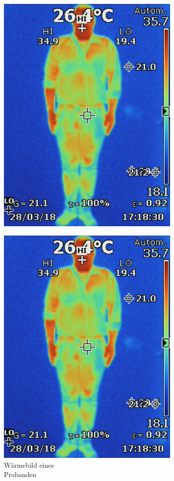 \begin{figure}[H]
		\centering
	\begin{minipage}[b]{0.4\textwidth}
			\centering

\includegraphics[width=0.8\textwidth]{fig/person_waerme.JPG}
\label{fig:Waermebild}
\caption[Wäermebild eines \\Probanden]{Wärmebild eines \\Probanden}
	\end{minipage}
	\begin{minipage}[b]{0.2\textwidth}
\end{minipage}
	\begin{minipage}[b]{0.4\textwidth}
			\centering
\includegraphics[width=0.8\textwidth]{fig/person_waerme.JPG}

\end{minipage}
\end{figure}
